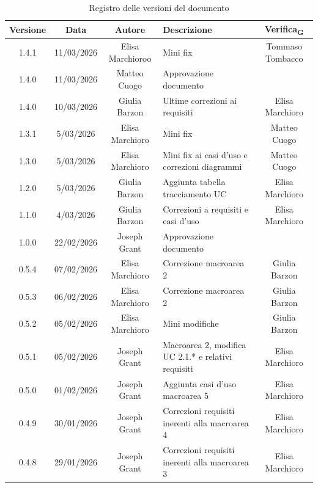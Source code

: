 \documentclass[11pt,a4paper]{article}
\newcommand{\gls}[1]{#1\textsubscript{G}}
\begin{document}
\begin{longtable}[H]{|c|c|c|>{\raggedright\arraybackslash}p{}|c|}
    \caption{Registro delle versioni del documento}
    \label{tab:versionamento} \\
        \hline
        \textbf{Versione} & \textbf{Data} & \textbf{Autore} & \textbf{Descrizione} & \textbf{\gls{Verifica}} \\
        \hline
        1.4.1 & 11/03/2026 & Elisa Marchioroo & Mini fix & Tommaso Tombacco \\
        \hline
        1.4.0 & 11/03/2026 & Matteo Cuogo & Approvazione documento & \\
        \hline
        1.4.0 & 10/03/2026 & Giulia Barzon & Ultime correzioni ai requisiti & Elisa Marchioro \\
        \hline
        1.3.1 & 5/03/2026 & Elisa Marchioro & Mini fix & Matteo Cuogo\\
        \hline
        1.3.0 & 5/03/2026 & Elisa Marchioro & Mini fix ai casi d'uso e correzioni diagrammi & Matteo Cuogo\\
        \hline
        1.2.0 & 5/03/2026 & Giulia Barzon & Aggiunta tabella tracciamento UC & Elisa Marchioro\\
        \hline
        1.1.0 & 4/03/2026 & Giulia Barzon & Correzioni a requisiti e casi d'uso & Elisa Marchioro\\
        \hline
        1.0.0 & 22/02/2026 & Joseph Grant & Approvazione documento & \\
        \hline
        0.5.4 & 07/02/2026 & Elisa Marchioro & Correzione macroarea 2 & Giulia Barzon\\
        \hline
        0.5.3 & 06/02/2026 & Elisa Marchioro & Correzione macroarea 2 & Giulia Barzon\\
        \hline
        0.5.2 & 05/02/2026 & Elisa Marchioro & Mini modifiche & Giulia Barzon\\
        \hline
        0.5.1 & 05/02/2026 & Joseph Grant & Macroarea 2, modifica UC 2.1.* e relativi requisiti & Elisa Marchioro\\
        \hline
        0.5.0 & 01/02/2026 & Joseph Grant & Aggiunta casi d'uso macroarea 5 & Elisa Marchioro\\
        \hline
        0.4.9 & 30/01/2026 & Joseph Grant & Correzioni requisiti inerenti alla macroarea 4 & Elisa Marchioro\\
        \hline
        0.4.8 & 29/01/2026 & Joseph Grant & Correzioni requisiti inerenti alla macroarea 3 & Elisa Marchioro\\

\end{longtable}
\end{document}
